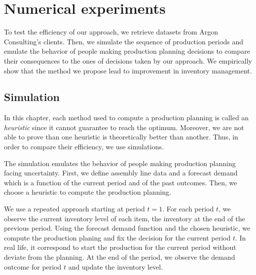 \chapter{Numerical experiments}
\label{chap:PDP:numerical-experiments}




To test the efficiency of our approach, we retrieve datasets from Argon Consulting's clients.
Then, we simulate the sequence of production periods and emulate the behavior of people making production planning decisions to compare their consequences to the ones of decisions taken by our approach.
We empirically show that the method we propose lead to improvement in inventory management.


\section{Simulation}


In this chapter, each method used to compute a production planning is called an \emph{heuristic} since it cannot guarantee to reach the optimum.
Moreover, we are not able to prove than one heuristic is theoretically better than another.
Thus, in order to compare their efficiency, we use simulations.


The simulation emulates the behavior of people making production planning facing uncertainty.
First, we define assembly line data and a forecast demand which is a function of the current period and of the past outcomes.
Then, we choose a heuristic to compute the production planning.


We use a repeated approach starting at period $t=1$.
For each period $t$, we observe the current inventory level of each item, \ie the inventory at the end of the previous period.
Using the forecast demand function and the chosen heuristic, we compute the production planing and fix the decision for the current period $t$.
In real life, it correspond to start the production for the current period without deviate from the planning.
At the end of the period, we observe the demand outcome for period $t$ and update the inventory level.


